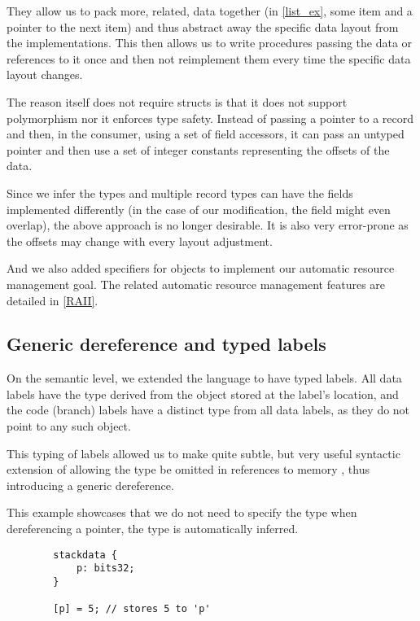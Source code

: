 They allow us to pack more, related, data together (in \cref{list_ex}, some item and a pointer to the next item) and thus abstract away the specific data layout from the implementations. This then allows us to write procedures passing the data or references to it once and then not reimplement them every time the specific data layout changes.

The reason \cmm itself does not require structs is that it does not support polymorphism nor it enforces type safety. Instead of passing a pointer to a record and then, in the consumer, using a set of field accessors, it can pass an untyped pointer and then use a set of integer constants representing the offsets of the data.

Since we infer the types and multiple record types can have the fields implemented differently (in the case of our modification, the field might even overlap), the above approach is no longer desirable. It is also very error-prone as the offsets may change with every layout adjustment.

And we also added  specifiers for  objects to implement our automatic resource management goal. The related automatic resource management features are detailed in \cref{RAII}.

\subsection{Generic dereference and typed labels}

On the semantic level, we extended the language to have typed labels. All data labels have the type derived from the object stored at the label's location, and the code (branch) labels have a distinct type from all data labels, as they do not point to any such object.

This typing of labels allowed us to make quite subtle, but very useful syntactic extension of allowing the type be omitted in references to memory \cite{ramsey2005c}, thus introducing a generic dereference.

\begin{ex}
    This example showcases that we do not need to specify the type when dereferencing a pointer, the type is automatically inferred.

    \begin{lstlisting}
        stackdata {
            p: bits32;
        }

        [p] = 5; // stores 5 to 'p'
    \end{lstlisting}
\end{ex}


